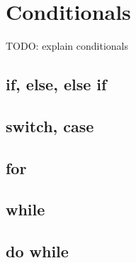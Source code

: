 \chapter{Conditionals}

TODO: explain conditionals

\section{if, else, else if}
\section{switch, case}
\section{for}
\section{while}
\section{do while}
